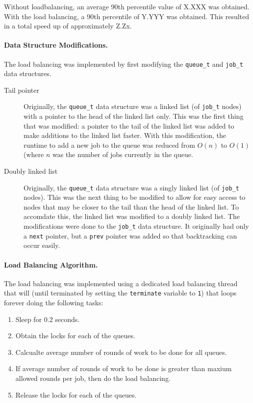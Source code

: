 \documentclass[12pt]{article}
\begin{document}
Without loadbalancing, an average 90th percentile value of X.XXX was obtained. With the load balancing, a 90th percentile of Y.YYY was obtained. This resulted in a total speed up of approximately Z.Zx.

\paragraph{Data Structure Modifications.} The load balancing was implemented by first modifying the {\tt queue\_t} and {\tt job\_t} data structures.
\begin{description}
  \item [Tail pointer] Originally, the {\tt queue\_t} data structure was a linked list (of {\tt job\_t} nodes) with a pointer to the head of the linked list only. This was the first thing that was modified: a pointer to the tail of the linked list was added to make additions to the linked list faster. With this modification, the runtime to add a new job to the queue was reduced from \( O(n) \) to \( O(1) \) (where \( n \) was the number of jobs currently in the queue.

  \item [Doubly linked list] Originally, the {\tt queue\_t} data structure was a singly linked list (of {\tt job\_t} nodes). This was the next thing to be modified to allow for easy access to nodes that may be closer to the tail than the head of the linked list. To accomdate this, the linked list was modified to a doubly linked list. The modifications were done to the {\tt job\_t} data structure. It originally had only a {\tt next} pointer, but a {\tt prev} pointer was added so that backtracking can occur easily.
\end{description}

\paragraph{Load Balancing Algorithm.} The load balancing was implemented using a dedicated load balancing thread that will (until terminated by setting the {\tt terminate} variable to {\tt 1}) that loops forever doing the following tasks:
\begin{enumerate}
  \item Sleep for 0.2 seconds.
  \item Obtain the locks for each of the queues.
  \item Calcualte average number of rounds of work to be done for all queues.
  \item If average number of rounds of work to be done is greater than maxium allowed rounds per job, then do the load balancing.
  \item Release the locks for each of the queues.
\end{enumerate}
\end{document}
